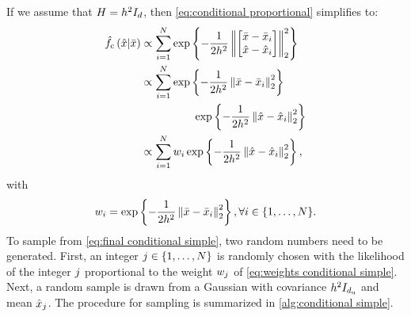 If we assume that $H=h^2I_{d}$, then \cref{eq:conditional proportional} simplifies to:
\begin{align}
	\densityestcond{\variablepartb}{\variableparta} 
	&\propto \sum_{\indexdata=1}^{\numberofsamples}
	\e{
		-\frac{1}{2h^2} \normtwo{
			\begin{bmatrix}
				\variableparta - \datapointparta{\indexdata} \\ 
				\variablepartb - \datapointpartb{\indexdata}
			\end{bmatrix}
		}^2
	} \nonumber \\
	&\propto \sum_{\indexdata=1}^{\numberofsamples}
	\e{-\frac{1}{2h^2} \normtwo{\variableparta - \datapointparta{\indexdata}}^2} \nonumber \\
	& \superquad \e{-\frac{1}{2h^2} \normtwo{\variablepartb - \datapointpartb{\indexdata}}^2} \nonumber \\
	&\propto \sum_{\indexdata=1}^{\numberofsamples} \weight{\indexdata}
	\e{-\frac{1}{2h^2} \normtwo{\variablepartb - \datapointpartb{\indexdata}}^2}, \label{eq:final conditional simple}
\end{align}
with 
\begin{equation}
	\label{eq:weights conditional simple}
	w_{i}=\exp\left\{ -\frac{1}{2h^2} \left\Vert \bar{x} - \bar{x}_{i} \right\Vert_2^2 \right\},
	\forall i \in \{1,\ldots,N\}.
\end{equation} 
To sample from \cref{eq:final conditional simple}, two random numbers need to be generated. 
First, an integer $j\in\{1,\ldots,N\}$ is randomly chosen with the likelihood of the integer $j$ proportional to the weight $w_{j}$ of \cref{eq:weights conditional simple}. 
Next, a random sample is drawn from a Gaussian with covariance $h^2 I_{d_\mathrm{u}}$ and mean $\hat{x}_{j}$.
The procedure for sampling is summarized in \cref{alg:conditional simple}.

